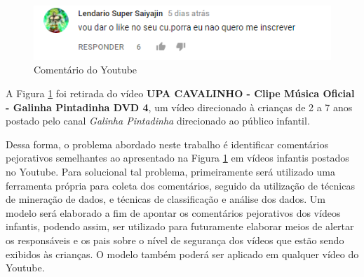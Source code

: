 \begin{figure}[H] %
	\caption{\label{fig:youtube_comment} Comentário do Youtube}
	\begin{center}
	    \includegraphics[scale=1]{figuras/figura_1.png} %
	\end{center}
\end{figure}

A Figura \ref{fig:youtube_comment} foi retirada do vídeo \textbf{UPA CAVALINHO - Clipe Música Oficial - Galinha Pintadinha DVD 4}, um vídeo direcionado à crianças de 2 a 7 anos postado pelo canal \emph{Galinha Pintadinha} direcionado ao público infantil. %


Dessa forma, o problema abordado neste trabalho é identificar comentários pejorativos semelhantes ao apresentado na Figura \ref{fig:youtube_comment} em vídeos infantis postados no Youtube. Para solucional tal problema, primeiramente será utilizado uma ferramenta própria para coleta dos comentários, seguido da utilização de técnicas de mineração de dados, e técnicas de classificação e análise dos dados. Um modelo será elaborado a fim de apontar os comentários pejorativos dos vídeos infantis, podendo assim, ser utilizado para futuramente elaborar meios de alertar os responsáveis e os pais sobre o nível de segurança dos vídeos que estão sendo exibidos às crianças. O modelo também poderá ser aplicado em qualquer vídeo do Youtube.  %


